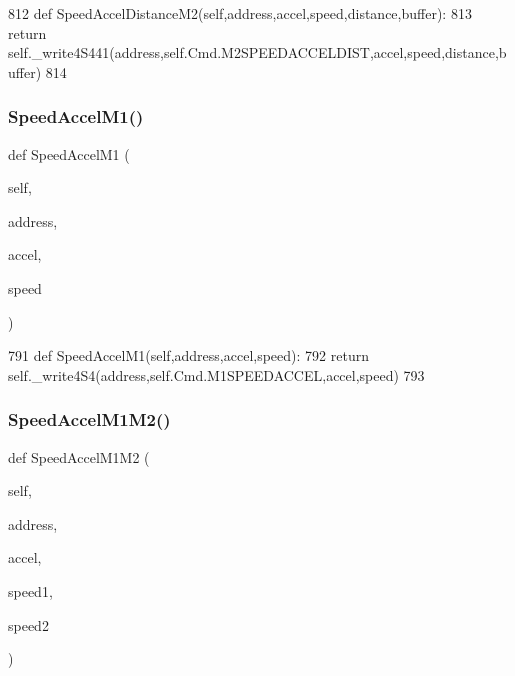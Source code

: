 \begin{DoxyCode}
812     \textcolor{keyword}{def }SpeedAccelDistanceM2(self,address,accel,speed,distance,buffer):
813         \textcolor{keywordflow}{return} self.\_write4S441(address,self.Cmd.M2SPEEDACCELDIST,accel,speed,distance,buffer)
814 
\end{DoxyCode}
\mbox{\label{classtoxic__hardware_1_1roboclaw__3_1_1Roboclaw_aed66489886b7cfdaaeb2be6cda59427c}} 
\subsubsection{\texorpdfstring{Speed\+Accel\+M1()}{SpeedAccelM1()}}
{\footnotesize\ttfamily def Speed\+Accel\+M1 (\begin{DoxyParamCaption}\item[{}]{self,  }\item[{}]{address,  }\item[{}]{accel,  }\item[{}]{speed }\end{DoxyParamCaption})}


\begin{DoxyCode}
791     \textcolor{keyword}{def }SpeedAccelM1(self,address,accel,speed):
792         \textcolor{keywordflow}{return} self.\_write4S4(address,self.Cmd.M1SPEEDACCEL,accel,speed)
793 
\end{DoxyCode}
\mbox{\label{classtoxic__hardware_1_1roboclaw__3_1_1Roboclaw_a5e5e1072e698207b50ecf2f6adf5e367}} 
\subsubsection{\texorpdfstring{Speed\+Accel\+M1\+M2()}{SpeedAccelM1M2()}}
{\footnotesize\ttfamily def Speed\+Accel\+M1\+M2 (\begin{DoxyParamCaption}\item[{}]{self,  }\item[{}]{address,  }\item[{}]{accel,  }\item[{}]{speed1,  }\item[{}]{speed2 }\end{DoxyParamCaption})}


